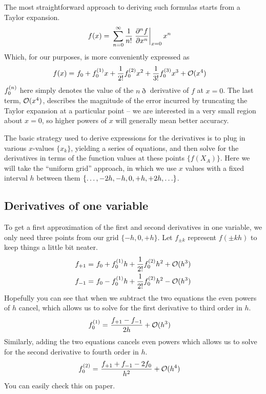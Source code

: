 \documentclass[11pt]{article}
\begin{document}
The most straightforward approach to deriving such formulas starts from a
Taylor expansion.
\begin{align}
    f(x) 
    =&\
    \sum_{n=0}^\infty \dfrac{1}{n!}
    \left. \dfrac{ \partial^{n} f }{\partial x ^{n}}\right|_{x=0} x^n
\end{align}
Which, for our purposes, is more conveniently expressed as
\begin{align}
    f(x) =&\
      f_0 + f_0^{(1)}x + \dfrac{1}{2!}f_0^{(2)}x^2
      + \dfrac{1}{3!}f_0^{(3)}x^3 + \mathcal{O}(x^4)
\end{align}
$f_0^{(n)}$ here simply denotes the value of the $n\eth$ derivative of $f$ at $x=0$.
The last term, $\mathcal{O}(x^4)$, describes the magnitude of the error incurred by
truncating the Taylor expansion at a particular point -- we are interested in a
very small region about $x=0$, so higher powers of $x$ will generally mean
better accuracy.

The basic strategy used to derive expressions for the derivatives is to plug in
various $x$-values $\{x_k\}$, yielding a series of equations, and then solve
for the derivatives in terms of the function values at these points
$\{f(X_A)\}$. Here we will take the ``uniform grid'' approach, in which we use
$x$ values with a fixed interval $h$ between them
$\{\ldots,-2h,-h,0,+h,+2h,\ldots\}$.

\subsection{Derivatives of one variable}
To get a first approximation of the first and second derivatives in one
variable, we only need three points from our grid $\{-h,0,+h\}$.
Let $f_{\pm k}$ represent $f(\pm kh)$ to keep things a little bit neater.
\begin{align*}
    f_{+1} =&\
    f_0 + f^{(1)}_0 h + \dfrac{1}{2!}f^{(2)}_0 h^2
    +\mathcal{O}(h^3)\\
    f_{-1} =&\
    f_0 - f^{(1)}_0 h + \dfrac{1}{2!}f^{(2)}_0 h^2
    -\mathcal{O}(h^3)
\end{align*}
Hopefully you can see that when we subtract the two equations the even powers
of $h$ cancel, which allows us to solve for the first derivative to third order
in $h$.
\begin{align*}
    f^{(1)}_0 =&\ \dfrac{f_{+1}-f_{-1}}{2h} +\mathcal{O}(h^3)
\end{align*}
Similarly, adding the two equations cancels even powers which allows us to
solve for the second derivative to fourth order in $h$.
\begin{align*}
    f^{(2)}_0 =&\ \dfrac{f_{+1}+f_{-1}-2f_0}{h^2} +\mathcal{O}(h^4)
\end{align*}
You can easily check this on paper.
\end{document}
